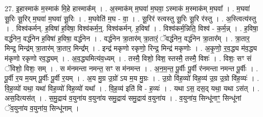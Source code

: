 \documentclass[17pt]{extarticle}
\begin{document}
27. इ॒हास्माक॑ म॒स्माक॑ मि॒हे हास्माक᳚म् । . अ॒स्माक॑म् म॒घवा॑ म॒घवा॒ ऽस्माक॑ म॒स्माक॑म् म॒घवा᳚ । . म॒घवा॑ सू॒रिः सू॒रिर् म॒घवा॑ म॒घवा॑ सू॒रिः । . म॒घवेति॑ म॒घ - वा॒ । . सू॒रिर॑ स्त्वस्तु सू॒रिः सू॒रि र॑स्तु । . अ॒स्त्वित्य॑स्तु । . विश्व॑कर्मन्. ह॒विषा॑ ह॒विषा॒ विश्व॑कर्म॒न्॒. विश्व॑कर्मन्. ह॒विषा᳚ । . विश्व॑कर्म॒न्निति॒ विश्व॑ - क॒र्म॒न्न् । . ह॒विषा॒ वर्द्ध॑नेन॒ वर्द्ध॑नेन ह॒विषा॑ ह॒विषा॒ वर्द्ध॑नेन । . वर्द्ध॑नेन त्रा॒तार॑म् त्रा॒तारं॒ ॅवर्द्ध॑नेन॒ वर्द्ध॑नेन त्रा॒तार᳚म् । . त्रा॒तार॒ मिन्द्र॒ मिन्द्र॑म् त्रा॒तार॑म् त्रा॒तार॒ मिन्द्र᳚म् । . इन्द्र॑ मकृणो रकृणो॒ रिन्द्र॒ मिन्द्र॑ मकृणोः । . अ॒कृ॒णो॒ र॒व॒द्ध्य म॑व॒द्ध्य म॑कृणो रकृणो रव॒द्ध्यम् । . अ॒व॒द्ध्यमित्य॑व॒ध्यम् । . तस्मै॒ विशो॒ विश॒ स्तस्मै॒ तस्मै॒ विशः॑ । . विशः॒ सꣳ सं ॅविशो॒ विशः॒ सम् । . स म॑नमन्ता नमन्त॒ सꣳ स म॑नमन्त । . अ॒न॒म॒न्त॒ पू॒र्वीः पू॒र्वी र॑नमन्ता नमन्त पू॒र्वीः । . पू॒र्वी र॒य म॒यम् पू॒र्वीः पू॒र्वी र॒यम् । . अ॒य मु॒ग्र उ॒ग्रो॑ ऽय म॒य मु॒ग्रः । . उ॒ग्रो वि॑ह॒व्यो॑ विह॒व्य॑ उ॒ग्र उ॒ग्रो वि॑ह॒व्यः॑ । . वि॒ह॒व्यो॑ यथा॒ यथा॑ विह॒व्यो॑ विह॒व्यो॑ यथा᳚ । . वि॒ह॒व्य॑ इति॑ वि - ह॒व्यः॑ । . यथा ऽस॒ दस॒द् यथा॒ यथा ऽस॑त् । . अस॒दित्यस॑त् । . स॒मु॒द्राय॑ व॒युना॑य व॒युना॑य समु॒द्राय॑ समु॒द्राय॑ व॒युना॑य । . व॒युना॑य॒ सिन्धू॑नाꣳ॒॒ सिन्धू॑नां ॅव॒युना॑य व॒युना॑य॒ सिन्धू॑नाम् । \newline
\end{document}
